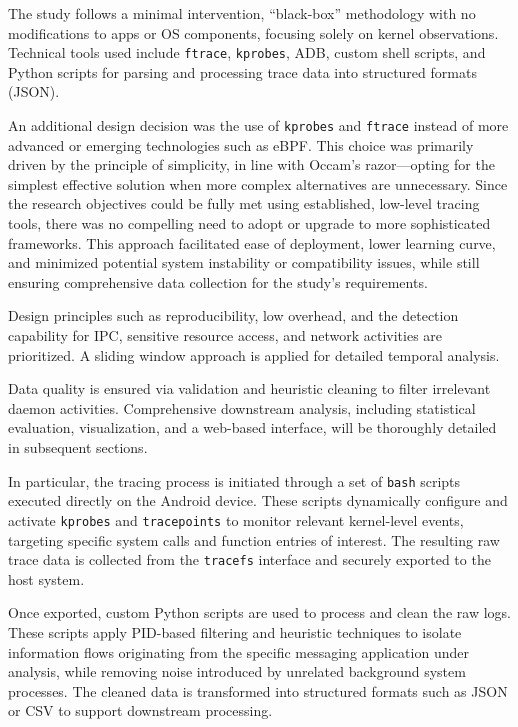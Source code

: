 \documentclass[a4paper,12pt]{report}
\begin{document}
The study follows a minimal intervention, ``black-box'' methodology with no modifications to apps or OS components, focusing solely on kernel observations. Technical tools used include \texttt{ftrace}, \texttt{kprobes}, ADB, custom shell scripts, and Python scripts for parsing and processing trace data into structured formats (JSON).

An additional design decision was the use of \texttt{kprobes} and \texttt{ftrace} instead of more advanced or emerging technologies such as eBPF. This choice was primarily driven by the principle of simplicity, in line with Occam's razor---opting for the simplest effective solution when more complex alternatives are unnecessary. Since the research objectives could be fully met using established, low-level tracing tools, there was no compelling need to adopt or upgrade to more sophisticated frameworks. This approach facilitated ease of deployment, lower learning curve, and minimized potential system instability or compatibility issues, while still ensuring comprehensive data collection for the study's requirements.

Design principles such as reproducibility, low overhead, and the detection capability for IPC, sensitive resource access, and network activities are prioritized. A sliding window approach is applied for detailed temporal analysis.

Data quality is ensured via validation and heuristic cleaning to filter irrelevant daemon activities. Comprehensive downstream analysis, including statistical evaluation, visualization, and a web-based interface, will be thoroughly detailed in subsequent sections.

In particular, the tracing process is initiated through a set of \texttt{bash} scripts executed directly on the Android device. These scripts dynamically configure and activate \texttt{kprobes} and \texttt{tracepoints} to monitor relevant kernel-level events, targeting specific system calls and function entries of interest. The resulting raw trace data is collected from the \texttt{tracefs} interface and securely exported to the host system.

Once exported, custom Python scripts are used to process and clean the raw logs. These scripts apply PID-based filtering and heuristic techniques to isolate information flows originating from the specific messaging application under analysis, while removing noise introduced by unrelated background system processes. The cleaned data is transformed into structured formats such as JSON or CSV to support downstream processing.
\end{document}
